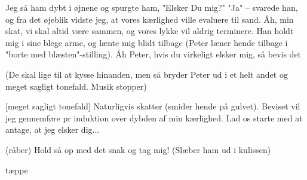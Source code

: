 \documentclass[10pt]{article}
\begin{document}
\begin{sketch}
  Jeg så ham dybt i øjnene og spurgte ham, "Elsker Du mig?"
  "Ja"
  -- svarede han,  og fra det øjeblik vidste jeg, at
vores kærlighed ville evaluere til sand.
  Åh, min skat, vi skal altid være sammen, og vores lykke vil
aldrig terminere.
  Han holdt mig i sine blege arme, og lænte mig blidt
tilbage (Peter læner hende tilbage i "borte med blæsten"-stilling).
Åh Peter, hvis du virkeligt elsker mig, så bevis det

\scene (De skal lige til at kysse hinanden, men så bryder Peter ud i et
helt andet og meget sagligt tonefald. Musik stopper)

[meget sagligt tonefald]  Naturligvis skatter (smider hende på gulvet). Beviset
vil jeg gennemføre pr induktion over dybden af min kærlighed. Lad
os starte med at antage, at jeg elsker dig...

  (råber) Hold så op med det snak og tag mig!
(Slæber ham ud i kulissen) 

\scene
tæppe

\end{sketch}
\end{document}
